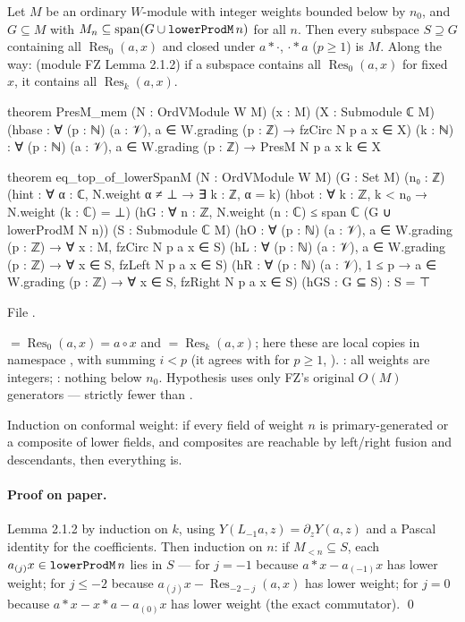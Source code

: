 \begin{theorem}\label{ch14:thm:crit}
Let $M$ be an ordinary $W$-module with integer weights bounded below by $n_0$, and $G\subseteq M$ with
$M_n\subseteq\operatorname{span}(G\cup\lean{lowerProdM}\,n)$ for all $n$.  Then every subspace $S\supseteq G$
containing all $\operatorname{Res}_0(a,x)$ and closed under $a*\cdot$, $\cdot*a$ ($p\ge1$) is $M$.  Along the way:
(module FZ Lemma 2.1.2) if a subspace contains all $\operatorname{Res}_0(a,x)$ for fixed $x$, it contains all
$\operatorname{Res}_k(a,x)$.
\end{theorem}
\begin{leancode}
theorem PresM_mem (N : OrdVModule W M) (x : M) (X : Submodule ℂ M)
    (hbase : ∀ (p : ℕ) (a : 𝒱), a ∈ W.grading (p : ℤ) → fzCirc N p a x ∈ X) (k : ℕ) :
    ∀ (p : ℕ) (a : 𝒱), a ∈ W.grading (p : ℤ) → PresM N p a x k ∈ X

theorem eq_top_of_lowerSpanM (N : OrdVModule W M) (G : Set M) (n₀ : ℤ)
    (hint : ∀ α : ℂ, N.weight α ≠ ⊥ → ∃ k : ℤ, α = k)
    (hbot : ∀ k : ℤ, k < n₀ → N.weight (k : ℂ) = ⊥)
    (hG : ∀ n : ℤ, N.weight (n : ℂ) ≤ span ℂ (G ∪ lowerProdM N n))
    (S : Submodule ℂ M)
    (hO : ∀ (p : ℕ) (a : 𝒱), a ∈ W.grading (p : ℤ) → ∀ x : M, fzCirc N p a x ∈ S)
    (hL : ∀ (p : ℕ) (a : 𝒱), a ∈ W.grading (p : ℤ) → ∀ x ∈ S, fzLeft N p a x ∈ S)
    (hR : ∀ (p : ℕ) (a : 𝒱), 1 ≤ p → a ∈ W.grading (p : ℤ) → ∀ x ∈ S, fzRight N p a x ∈ S)
    (hGS : G ⊆ S) : S = ⊤
\end{leancode}
File .

\begin{dictionary}
 $=\operatorname{Res}_0(a,x)=a\circ x$ and  $=\operatorname{Res}_k(a,x)$;
here these are local copies in namespace , with  summing $i<p$ (it agrees with
 for $p\ge1$, ).  : all weights are integers; : nothing
below $n_0$.  Hypothesis  uses only FZ's original $O(M)$ generators — strictly fewer than
.
\end{dictionary}

\begin{physics}
Induction on conformal weight: if every field of weight $n$ is primary-generated or a composite of
lower fields, and composites are reachable by left/right fusion and descendants, then everything is.
\end{physics}

\paragraph{Proof on paper.}  Lemma 2.1.2 by induction on $k$, using
$Y(L_{-1}a,z)=\partial_zY(a,z)$ and a Pascal identity for the coefficients.  Then induction on $n$: if
$M_{<n}\subseteq S$, each $a_{(j)}x\in\lean{lowerProdM}\,n$ lies in $S$ — for $j=-1$ because $a*x-a_{(-1)}x$
has lower weight; for $j\le-2$ because $a_{(j)}x-\operatorname{Res}_{-2-j}(a,x)$ has lower weight; for $j=0$
because $a*x-x*a-a_{(0)}x$ has lower weight (the exact commutator). \qed

